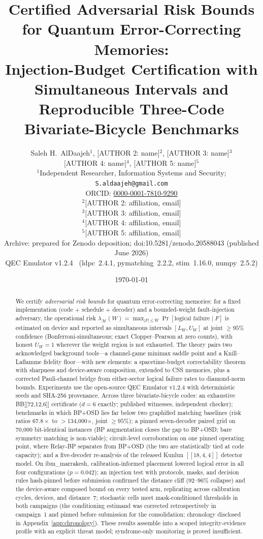 \documentclass[11pt,a4paper]{article}
\title{Certified Adversarial Risk Bounds for Quantum Error-Correcting Memories:\\
Injection-Budget Certification with Simultaneous Intervals and\\
Reproducible Three-Code Bivariate-Bicycle Benchmarks}
\author{Saleh H.\ AlDaajeh$^{1}$, [AUTHOR 2: name]$^{2}$, [AUTHOR 3: name]$^{3}$\\[2pt]
[AUTHOR 4: name]$^{4}$, [AUTHOR 5: name]$^{5}$\\[4pt]
\small $^{1}$Independent Researcher, Information Systems and Security; \texttt{S.aldaajeh@gmail.com}\\
\small ORCID: \href{https://orcid.org/0000-0001-7810-9290}{0000-0001-7810-9290}\\
\small $^{2}$[AUTHOR 2: affiliation, email]\\
\small $^{3}$[AUTHOR 3: affiliation, email]\\
\small $^{4}$[AUTHOR 4: affiliation, email]\\
\small $^{5}$[AUTHOR 5: affiliation, email]\\[4pt]
\small Archive: prepared for Zenodo deposition; doi:10.5281/zenodo.20588043 (published June 2026)\\[2pt]
\small QEC Emulator v1.2.4~\cite{AlDaajeh2026emulator}
(ldpc~2.4.1, pymatching~2.2.2, stim~1.16.0, numpy~2.5.2)}
\date{\today}
\begin{document}
\maketitle

\begin{abstract}
We certify \emph{adversarial risk bounds} for quantum error-correcting
memories: for a fixed implementation (code $+$ schedule $+$ decoder)
and a bounded-weight fault-injection adversary, the operational risk
$\lambda_{\mathcal{M}}(W)=\max_{|F|\le W}\Pr[\text{logical failure}\mid
F]$ is estimated on device and reported as simultaneous intervals
$[L_W,U_W]$ at joint $\ge95\%$ confidence (Bonferroni-simultaneous;
exact Clopper--Pearson at zero counts), with honest $U_W=1$ wherever
the weight region is not exhausted.
The theory pairs two acknowledged background tools---a channel-game
minimax saddle point and a Knill--Laflamme fidelity floor---with new
elements: a spacetime-budget correctability theorem with sharpness and
device-aware composition, extended to CSS memories, plus a corrected
Pauli-channel bridge from either-sector logical failure rates to
diamond-norm bounds. Experiments use the open-source QEC
Emulator v1.2.4 with deterministic seeds and SHA-256 provenance.
Across three bivariate-bicycle codes: an exhaustive BB[[72,12,6]]
certificate ($d=6$ exactly; published witnesses, independent checker);
benchmarks in which BP+OSD lies far below two graphified matching
baselines (risk ratios $67.8\times$ to $>$134{,}000$\times$, joint
$\ge95\%$); a pinned seven-decoder paired grid on 70{,}000
bit-identical instances (BP augmentation closes the gap to BP+OSD;
bare symmetry matching is non-viable); circuit-level corroboration on
one pinned operating point, where Relay-BP separates from BP+OSD (the
two are statistically tied at code capacity); and a five-decoder
re-analysis of the released Kunlun $[[18,4,4]]$ detector model. On
ibm\_marrakesh, calibration-informed placement lowered logical error in
all four configurations ($p=0.042$); an injection test with protocols,
masks, and decision rules hash-pinned before submission
confirmed the distance cliff ($92$--$96\%$ collapse) and the
device-aware composed bound on every tested arm, replicating across
calibration cycles, devices, and distance~7; stochastic cells meet
mask-conditioned thresholds in both campaigns (the conditioning
estimand was corrected retrospectively in campaign~1 and pinned before
submission for the consolidation; chronology disclosed in
Appendix~\ref{app:chronology}).
These results assemble into a scoped integrity-evidence profile with an
explicit threat model; syndrome-only monitoring is proved insufficient.

\end{abstract}
\end{document}
